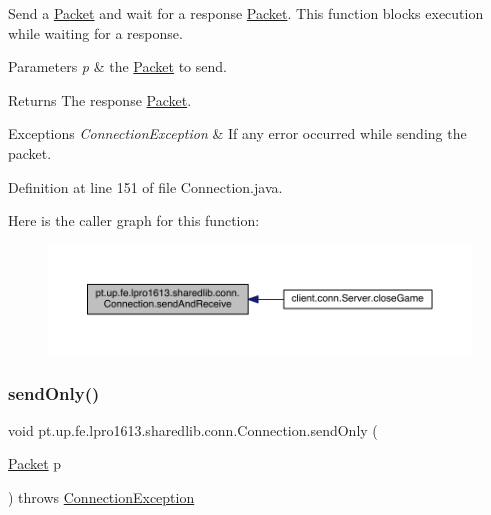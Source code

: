 Send a \hyperlink{classpt_1_1up_1_1fe_1_1lpro1613_1_1sharedlib_1_1conn_1_1_packet}{Packet} and wait for a response \hyperlink{classpt_1_1up_1_1fe_1_1lpro1613_1_1sharedlib_1_1conn_1_1_packet}{Packet}. This function blocks execution while waiting for a response.


\begin{DoxyParams}{Parameters}
{\em p} & the \hyperlink{classpt_1_1up_1_1fe_1_1lpro1613_1_1sharedlib_1_1conn_1_1_packet}{Packet} to send. \\
\hline
\end{DoxyParams}
\begin{DoxyReturn}{Returns}
The response \hyperlink{classpt_1_1up_1_1fe_1_1lpro1613_1_1sharedlib_1_1conn_1_1_packet}{Packet}. 
\end{DoxyReturn}

\begin{DoxyExceptions}{Exceptions}
{\em Connection\+Exception} & If any error occurred while sending the packet. \\
\hline
\end{DoxyExceptions}


Definition at line 151 of file Connection.\+java.

Here is the caller graph for this function\+:
\nopagebreak
\begin{figure}[H]
\begin{center}
\leavevmode
\includegraphics[width=350pt]{classpt_1_1up_1_1fe_1_1lpro1613_1_1sharedlib_1_1conn_1_1_connection_ac70216d1f9f5ed2c8b29431b10108620_icgraph}
\end{center}
\end{figure}
\hypertarget{classpt_1_1up_1_1fe_1_1lpro1613_1_1sharedlib_1_1conn_1_1_connection_acdcf8af7c9a37ede122c6db80d06668f}{}\label{classpt_1_1up_1_1fe_1_1lpro1613_1_1sharedlib_1_1conn_1_1_connection_acdcf8af7c9a37ede122c6db80d06668f} 
\subsubsection{\texorpdfstring{send\+Only()}{sendOnly()}}
{\footnotesize\ttfamily void pt.\+up.\+fe.\+lpro1613.\+sharedlib.\+conn.\+Connection.\+send\+Only (\begin{DoxyParamCaption}\item[{\hyperlink{classpt_1_1up_1_1fe_1_1lpro1613_1_1sharedlib_1_1conn_1_1_packet}{Packet}}]{p }\end{DoxyParamCaption}) throws \hyperlink{classpt_1_1up_1_1fe_1_1lpro1613_1_1sharedlib_1_1exceptions_1_1_connection_exception}{Connection\+Exception}}

